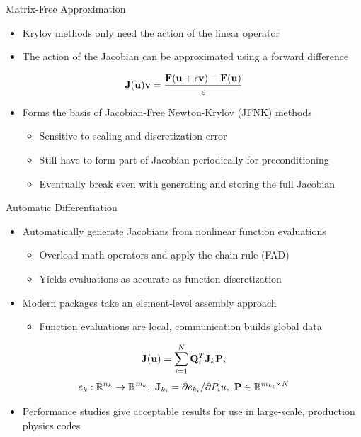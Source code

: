 \documentclass{beamer}
\begin{document}
\begin{frame}{Matrix-Free Approximation}

  
  \begin{itemize}
  \item Krylov methods only need the action of the linear operator
  \item The action of the Jacobian can be approximated using a forward
    difference
  \end{itemize}

  \[
  \mathbf{J}(\mathbf{u})\mathbf{v} = \frac{\mathbf{F}(\mathbf{u} + \epsilon \mathbf{v}) -
    \mathbf{F}(\mathbf{u})}{\epsilon}
  \]

  \begin{itemize}
  \item Forms the basis of Jacobian-Free Newton-Krylov (JFNK) methods
    \begin{itemize}
    \item Sensitive to scaling and discretization error
    \item Still have to form part of Jacobian periodically for
      preconditioning
    \item Eventually break even with generating and storing the full
      Jacobian
    \end{itemize}
  \end{itemize}

\end{frame}

\begin{frame}{Automatic Differentiation}

  \begin{itemize}
  \item Automatically generate Jacobians from nonlinear function
    evaluations
    \begin{itemize}
    \item Overload math operators and apply the chain rule (FAD)
    \item Yields evaluations as accurate as function discretization
    \end{itemize}
  \item Modern packages take an element-level assembly approach
    \begin{itemize}
    \item Function evaluations are local, communication builds global
      data
    \end{itemize}
  \end{itemize}

  \[
  \mathbf{J}(\mathbf{u}) = \sum_{i=1}^N \mathbf{Q}^T_i \mathbf{J}_k \mathbf{P}_i
  \]
  \[
  e_k : \mathbb{R}^{n_k} \rightarrow \mathbb{R}^{m_k},\ \mathbf{J}_{k_i} =
  \partial e_{k_i} / \partial P_i u,\ \mathbf{P} \in \mathbb{R}^{m_{k_i}
    \times N}
  \]

  \begin{itemize}
  \item Performance studies give acceptable results for use in
    large-scale, production physics codes
  \end{itemize}

\end{frame}
\end{document}
